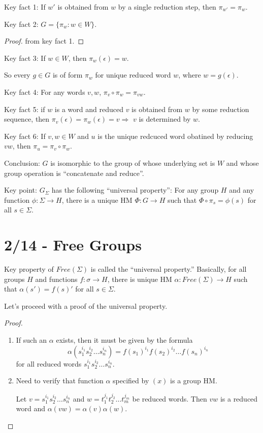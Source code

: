 \documentclass{report}
\begin{document}
Key fact 1: If $w'$ is obtained from $w$ by a single reduction step, then $\pi_{w'} = \pi_{w}$.

Key fact 2: $G = \{\pi_w : w \in W\}$.
\begin{proof}
    from key fact 1. 
\end{proof}
Key fact 3: If $w \in W$, then $\pi_w(\epsilon) = w$. 

So every $g \in G$ is of form $\pi_w$ for unique reduced word $w$, where $w = g(\epsilon)$. 

Key fact 4: For any words $v, w$, $\pi_v \circ \pi_w = \pi_{vw}$.

Key fact 5: if $w$ is a word and reduced $v$ is obtained from $w$ by some reduction sequence, then $\pi_v(\epsilon) = \pi_w(\epsilon) = v \Rightarrow$ $v$ is determined by $w$. 

Key fact 6: If $v,w \in W$ and $u$ is the unique redcuced word obatined by reducing $vw$, then $\pi_u = \pi_v \circ \pi_w$.

Conclusion: $G$ is isomorphic to the group of whose underlying set is $W$ and whose group operation is ``concatenate and reduce''.

Key point: $G_\Sigma$ has the following ``universal property'': For any group $H$ and any function $\phi : \Sigma \to H$, there is a unique HM $\Phi : G \to H$ such that $\Phi \circ \pi_s = \phi(s)$ for all $s \in \Sigma$.


\section{2/14 - Free Groups}
Key property of $Free(\Sigma)$ is called the ``universal property.'' Basically, for all groups $H$ and functions $f : \sigma \to H$, there is unique HM $\alpha : Free(\Sigma) \to H$ such that $\alpha(s') = f(s)'$ for all $s \in \Sigma$.

Let's proceed with a proof of the universal property.
\begin{proof}
    \begin{enumerate}
        \item If such an $\alpha$ exists, then it must be given by the formula 
        $$\alpha(s_1^{i_1}s_2^{i_2}\ldots s_n^{i_n}) = f(s_1)^{i_1}f(s_2)^{i_2}\ldots f(s_n)^{i_n}$$
        for all reduced words $s_1^{i_1}s_2^{i_2}\ldots s_n^{i_n}$.
        \item Need to verify that function $\alpha$ specified by $(x)$ is a group HM.
        
        Let $v= s_1^{i_1}s_2^{i_2}\ldots s_n^{i_n}$ and $w = t_1^{j_1}t_2^{j_2}\ldots t_m^{j_m}$ be reduced words. Then $vw$ is a reduced word and $\alpha(vw) = \alpha(v)\alpha(w)$.
    \end{enumerate}
\end{proof}
\end{document}
